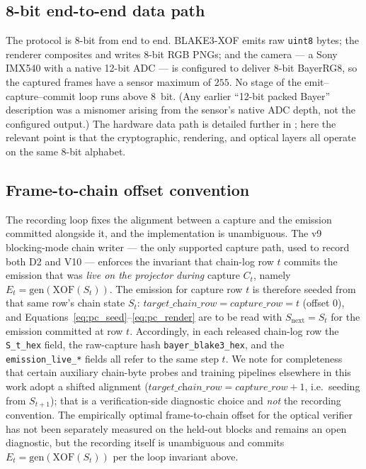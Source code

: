 \subsection{8-bit end-to-end data path}
\label{subsec:pc_8bit}

The protocol is 8-bit from end to end. BLAKE3-XOF emits raw \texttt{uint8} bytes; the renderer composites and writes 8-bit RGB PNGs; and the camera --- a Sony IMX540 with a native 12-bit ADC --- is configured to deliver 8-bit BayerRG8, so the captured frames have a sensor maximum of $255$. No stage of the emit--capture--commit loop runs above \SI{8}{bit}. (Any earlier ``12-bit packed Bayer'' description was a misnomer arising from the sensor's native ADC depth, not the configured output.) The hardware data path is detailed further in ; here the relevant point is that the cryptographic, rendering, and optical layers all operate on the same 8-bit alphabet.

\subsection{Frame-to-chain offset convention}
\label{subsec:pc_offset}

The recording loop fixes the alignment between a capture and the emission committed alongside it, and the implementation is unambiguous. The v9 blocking-mode chain writer --- the only supported capture path, used to record both D2 and V10 --- enforces the invariant that chain-log row $t$ commits the emission that was \emph{live on the projector during} capture $C_t$, namely $E_t = \mathrm{gen}(\mathrm{XOF}(S_t))$. The emission for capture row $t$ is therefore seeded from that same row's chain state $S_t$: $\textit{target\_chain\_row} = \textit{capture\_row} = t$ (offset $0$), and Equations~\eqref{eq:pc_seed}--\eqref{eq:pc_render} are to be read with $S_{\mathrm{next}} = S_t$ for the emission committed at row $t$. Accordingly, in each released chain-log row the \texttt{S\_t\_hex} field, the raw-capture hash \texttt{bayer\_blake3\_hex}, and the \texttt{emission\_live\_*} fields all refer to the same step $t$. We note for completeness that certain auxiliary chain-byte probes and training pipelines elsewhere in this work adopt a shifted alignment ($\textit{target\_chain\_row} = \textit{capture\_row} + 1$, i.e.\ seeding from $S_{t+1}$); that is a verification-side diagnostic choice and \emph{not} the recording convention. The empirically optimal frame-to-chain offset for the optical verifier has not been separately measured on the held-out blocks and remains an open diagnostic, but the recording itself is unambiguous and commits $E_t = \mathrm{gen}(\mathrm{XOF}(S_t))$ per the loop invariant above.

